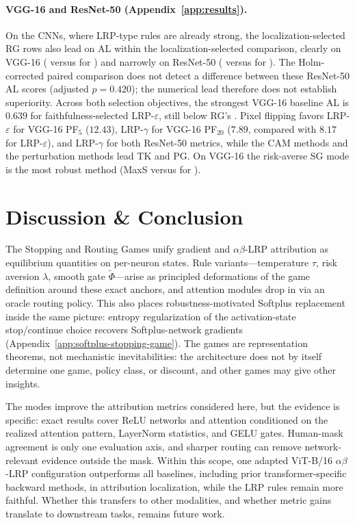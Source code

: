 \documentclass[twoside]{article}
\newif\ifch \chfalse
\newcommand{\ch}[1]{\ifch\textcolor{magenta}{#1}\else#1\fi}
\newcommand{\1}{\mathbf{1}}
\begin{document}
\paragraph{VGG-16 and ResNet-50 (Appendix~\ref{app:results}).}
On the CNNs, where \ac{LRP}-type rules are already strong, the localization-selected \ac{RG} rows
also lead on AL within the localization-selected comparison, clearly on VGG-16 (\vggRGlocAL{} versus \vggBestBaseAL{} for \vggBestBaseALname{})
and narrowly on ResNet-50 (\resRGlocAL{} versus \resBestBaseAL{} for
\resBestBaseALname{}). The Holm-corrected paired comparison does not detect a difference between these ResNet-50 AL scores (adjusted $p=0.420$); the numerical lead therefore does not establish superiority. Across both selection objectives, the strongest VGG-16 baseline AL is $0.639$ for faithfulness-selected LRP-$\varepsilon$, still below \ac{RG}'s \vggRGlocAL{}.
Pixel flipping favors LRP-$\varepsilon$ for VGG-16 PF$_5$ ($12.43$), LRP-$\gamma$ for VGG-16 PF$_{20}$ ($7.89$, compared with $8.17$ for LRP-$\varepsilon$), and LRP-$\gamma$ for both ResNet-50 metrics, while the \ac{CAM} methods and the perturbation methods lead TK and PG.
On VGG-16 the risk-averse \ac{SG} mode is the most robust method (MaxS \vggSGlocMaxS{} versus
\vggBestBaseMaxS{} for \vggBestBaseMaxSname{}).
\section{Discussion \& Conclusion}\label{sec:discussion}

The Stopping and Routing Games unify gradient and $\alpha\beta$-\ac{LRP} attribution as equilibrium
quantities on per-neuron states. Rule variants---temperature $\tau$, risk aversion $\lambda$,
smooth gate $\tilde\Phi$---arise as principled deformations of the game definition around these
exact anchors, and attention modules drop in via an oracle routing policy. This also places
robustness-motivated Softplus replacement~\citep{Dombrowski2020} inside the same picture: entropy
regularization of the activation-state stop/continue choice recovers Softplus-network gradients
(Appendix~\ref{app:softplus-stopping-game}). The games are representation theorems, not mechanistic
inevitabilities: the architecture does not by itself determine one game, policy class, or discount,
and other games may give other insights.

\ch{The modes improve the attribution metrics considered here, but the evidence is specific: exact results cover ReLU networks and attention conditioned on the realized attention pattern, LayerNorm statistics, and GELU gates. Human-mask agreement is only one evaluation axis, and sharper routing can remove network-relevant evidence outside the mask. Within this scope, one adapted ViT-B/16 $\alpha\beta$-\ac{LRP} configuration outperforms all baselines, including prior transformer-specific backward methods, in attribution localization, while the \ac{LRP} rules remain more faithful. Whether this transfers to other modalities, and whether metric gains translate to downstream tasks, remains future work.}
\end{document}
